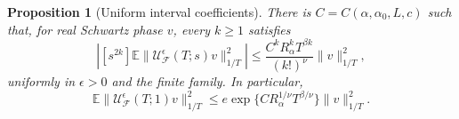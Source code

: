 \documentclass[12pt]{article}
\numberwithin{equation}{section}
\newtheorem{proposition}[theorem]{Proposition}
\theoremstyle{definition}
\newcommand{\E}{\mathbb{E}}
\begin{document}
\begin{proposition}[Uniform interval coefficients]\label{P:interval-coefficients}
  There is $C=C(\alpha,\alpha_0,L,c)$ such that, for real Schwartz phase $v$,
  every $k\ge1$ satisfies
  \begin{equation}\label{E:interval-coefficient-bound}
    \left|[s^{2k}]\E\|\mathcal U_{\mathcal F}^\epsilon(T;s)v\|_{1/T}^2\right|
    \le\frac{C^k R_\alpha^k T^{\beta k}}{(k!)^\nu}\|v\|_{1/T}^2,
  \end{equation}
  uniformly in $\epsilon>0$ and the finite family.
  In particular,
  \begin{equation}\label{E:interval-phase-bound}
    \E\|\mathcal U_{\mathcal F}^\epsilon(T;1)v\|_{1/T}^2
    \le e\exp\{C R_\alpha^{1/\nu}T^{\beta/\nu}\}\|v\|_{1/T}^2.
  \end{equation}
\end{proposition}
\end{document}
